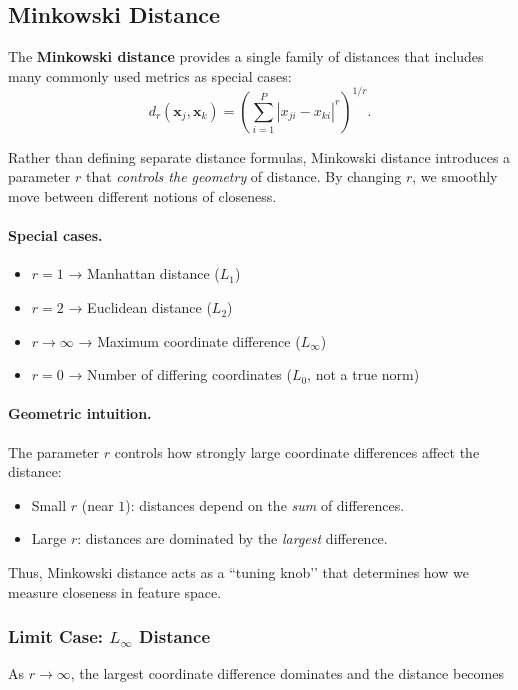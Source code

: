 \documentclass{article}
\begin{document}
\subsection{Minkowski Distance}

The \textbf{Minkowski distance} provides a single family of distances that
includes many commonly used metrics as special cases:
\[
d_r(\mathbf{x}_j,\mathbf{x}_k)
=\left(\sum_{i=1}^{P}|x_{ji}-x_{ki}|^r\right)^{1/r}.
\]

Rather than defining separate distance formulas, Minkowski distance
introduces a parameter $r$ that \emph{controls the geometry} of distance.
By changing $r$, we smoothly move between different notions of closeness.

\paragraph{Special cases.}
\begin{itemize}
\item $r=1$  → Manhattan distance ($L_1$)
\item $r=2$  → Euclidean distance ($L_2$)
\item $r\to\infty$ → Maximum coordinate difference ($L_\infty$)
\item $r=0$  → Number of differing coordinates ($L_0$, not a true norm)
\end{itemize}

\paragraph{Geometric intuition.}
The parameter $r$ controls how strongly large coordinate differences
affect the distance:

\begin{itemize}
\item Small $r$ (near $1$): distances depend on the \emph{sum} of differences.
\item Large $r$: distances are dominated by the \emph{largest} difference.
\end{itemize}

Thus, Minkowski distance acts as a “tuning knob’’ that determines how we
measure closeness in feature space.

\subsubsection{Limit Case: $L_\infty$ Distance}

As $r\rightarrow\infty$, the largest coordinate difference dominates and
the distance becomes
\end{document}
